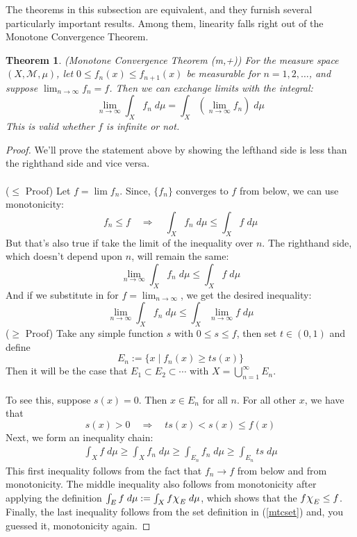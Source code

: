 \documentclass[12pt]{article}
\theoremstyle{plain}
\newtheorem{thm}{Theorem}[subsection]
\theoremstyle{definition}
\theoremstyle{remark}
\newcommand*{\Chi}{\mbox{\large$\chi$}} %
\begin{document}
The theorems in this subsection are equivalent, and they furnish several particularly important results. Among them, linearity falls right out of the Monotone Convergence Theorem.

\begin{thm}
\emph{(Monotone Convergence Theorem (m,+))} For the measure space $(X,\mathscr{M},\mu)$, let $0\leq f_n(x)\leq f_{n+1}(x)$ be measurable for $n=1,2,\ldots$, and suppose $\lim_{n\rightarrow\infty}f_n=f$. Then we can exchange limits with the integral:
\[
    \lim_{n\rightarrow\infty} \int_X f_n \; d\mu =
    \int_X \left(\lim_{n\rightarrow\infty} f_n\right) 
    \; d\mu 
\]
This is valid whether $f$ is infinite or not.
\end{thm}
\begin{proof} We'll prove the statement above by showing the lefthand side is less than the righthand side and vice versa.
\\
\\
($\leq$ Proof) Let $f = \lim f_n$. Since, $\{f_n\}$ converges to $f$ from below, we can use monotonicity: 
\[
    f_n \leq f \quad \Rightarrow\quad
    \int_X f_n \; d\mu \leq \int_X f\; d\mu
\]
But that's also true if take the limit of the inequality over $n$. The righthand side, which doesn't depend upon $n$, will remain the same:
\[
    \lim_{n\rightarrow\infty}
    \int_X f_n \; d\mu \leq \int_X f\; d\mu
\]
And if we substitute in for $f=\lim_{n\rightarrow\infty}$, we get the desired inequality:
\[
    \lim_{n\rightarrow\infty}
    \int_X f_n \; d\mu 
    \leq \int_X \lim_{n\rightarrow\infty}f\; d\mu
\]
($\geq$ Proof) Take any simple function $s$ with $0\leq s\leq f$, then set $t\in(0,1)$ and define
\begin{equation}
    \label{mtcset}
    E_n := \{x \; |\; f_n(x) \geq ts(x) \}
\end{equation}
Then it will be the case that $E_1\subset E_2\subset \cdots$ with $X = \bigcup^\infty_{n=1} E_n$.
\\
\\
To see this, suppose $s(x)=0$. Then $x\in E_n$ for all $n$. For all other $x$, we have that
\[
    s(x)>0\quad\Rightarrow\quad ts(x)< s(x)\leq f(x)
\]
Next, we form an inequality chain:
\begin{align}
    \label{ineqchain}
    \int_X f\;d\mu \geq \int_X f_n\;d\mu
    \geq \int_{E_n} f_n \;d\mu\geq \int_{E_n} ts \;d\mu
\end{align}
This first inequality follows from the fact that $f_n\rightarrow f$ from below and from monotonicity. The middle inequality also follows from monotonicity after applying the definition $\int_E f \; d\mu := \int_X f\Chi_E \; d\mu$, which shows that the $f\Chi_E\leq f$. Finally, the last inequality follows from the set definition in (\ref{mtcset}) and, you guessed it, monotonicity again.


\end{proof}
\end{document}
